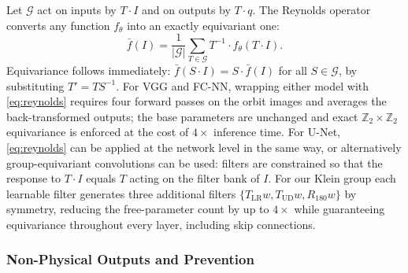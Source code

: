 \documentclass[conference,compsoc]{IEEEtran}
\begin{document}
Let $\mathcal{G}$ act on inputs by $T\cdot I$ and on outputs by $T\cdot q$. The Reynolds operator converts any function $f_\theta$ into an exactly equivariant one:
\begin{equation}
  \bar{f}(I) = \frac{1}{|\mathcal{G}|}\sum_{T\in\mathcal{G}} T^{-1}\cdot f_\theta(T\cdot I).
  \label{eq:reynolds}
\end{equation}
Equivariance follows immediately: $\bar{f}(S\cdot I)=S\cdot\bar{f}(I)$ for all $S\in\mathcal{G}$, by substituting $T'=TS^{-1}$. For VGG and FC-NN, wrapping either model with \eqref{eq:reynolds} requires four forward passes on the orbit images and averages the back-transformed outputs; the base parameters are unchanged and exact $\mathbb{Z}_2\times\mathbb{Z}_2$ equivariance is enforced at the cost of $4\times$ inference time. For U-Net, \eqref{eq:reynolds} can be applied at the network level in the same way, or alternatively group-equivariant convolutions \cite{cohen2016group} can be used: filters are constrained so that the response to $T\cdot I$ equals $T$ acting on the filter bank of $I$. For our Klein group each learnable filter generates three additional filters $\{T_\mathrm{LR}w, T_\mathrm{UD}w, R_{180}w\}$ by symmetry, reducing the free-parameter count by up to $4\times$ while guaranteeing equivariance throughout every layer, including skip connections.

\subsubsection{Non-Physical Outputs and Prevention}
\end{document}
